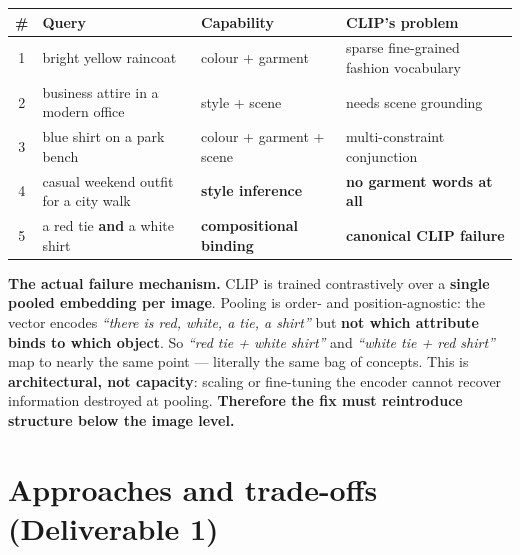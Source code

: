 \documentclass[10pt,a4paper]{article}
\begin{document}
\begin{center}\small
\begin{tabularx}{\textwidth}{@{}c>{\raggedright\arraybackslash}p{}
                                >{\raggedright\arraybackslash}p{}
                                >{\raggedright\arraybackslash}X@{}}
\toprule
\# & \textbf{Query} & \textbf{Capability} & \textbf{CLIP's problem} \\
\midrule
1 & bright yellow raincoat & colour + garment & sparse fine-grained fashion vocabulary \\
2 & business attire in a modern office & style + scene & needs scene grounding \\
3 & blue shirt on a park bench & colour + garment + scene & multi-constraint conjunction \\
4 & casual weekend outfit for a city walk & \textbf{style inference} & \textbf{no garment words at all} \\
5 & a red tie \textbf{and} a white shirt & \textbf{compositional binding} & \textbf{canonical CLIP failure} \\
\bottomrule
\end{tabularx}
\end{center}

\textbf{The actual failure mechanism.} CLIP is trained contrastively over a \textbf{single pooled
embedding per image}. Pooling is order- and position-agnostic: the vector encodes \emph{``there is
red, white, a tie, a shirt''} but \textbf{not which attribute binds to which object}. So
\emph{``red tie + white shirt''} and \emph{``white tie + red shirt''} map to nearly the same point
--- literally the same bag of concepts. This is \textbf{architectural, not capacity}: scaling or
fine-tuning the encoder cannot recover information destroyed at pooling. \textbf{Therefore the fix
must reintroduce structure below the image level.}

\section{Approaches and trade-offs \textnormal{\small(Deliverable 1)}}
\end{document}
